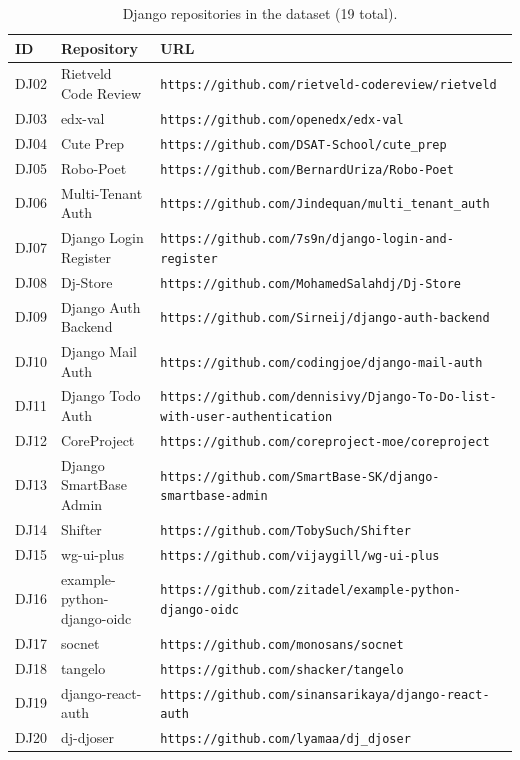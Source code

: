 \begin{table}[H]
\centering
\caption{Django repositories in the dataset (19 total).}
\label{tab:dataset-django-full}
\renewcommand{\arraystretch}{1.3}
\small
\begin{tabular}{p{} p{} p{}}
\toprule
\textbf{ID} & \textbf{Repository} & \textbf{URL} \\
\midrule
DJ02 & Rietveld Code Review          & {\small\nolinkurl{https://github.com/rietveld-codereview/rietveld}} \\
DJ03 & edx-val                       & {\small\nolinkurl{https://github.com/openedx/edx-val}} \\
DJ04 & Cute Prep                     & {\small\nolinkurl{https://github.com/DSAT-School/cute_prep}} \\
DJ05 & Robo-Poet                     & {\small\nolinkurl{https://github.com/BernardUriza/Robo-Poet}} \\
DJ06 & Multi-Tenant Auth             & {\small\nolinkurl{https://github.com/Jindequan/multi_tenant_auth}} \\
DJ07 & Django Login Register         & {\small\nolinkurl{https://github.com/7s9n/django-login-and-register}} \\
DJ08 & Dj-Store                      & {\small\nolinkurl{https://github.com/MohamedSalahdj/Dj-Store}} \\
DJ09 & Django Auth Backend           & {\small\nolinkurl{https://github.com/Sirneij/django-auth-backend}} \\
DJ10 & Django Mail Auth              & {\small\nolinkurl{https://github.com/codingjoe/django-mail-auth}} \\
DJ11 & Django Todo Auth              & {\small\nolinkurl{https://github.com/dennisivy/Django-To-Do-list-with-user-authentication}} \\
DJ12 & CoreProject                   & {\small\nolinkurl{https://github.com/coreproject-moe/coreproject}} \\
DJ13 & Django SmartBase Admin        & {\small\nolinkurl{https://github.com/SmartBase-SK/django-smartbase-admin}} \\
DJ14 & Shifter                       & {\small\nolinkurl{https://github.com/TobySuch/Shifter}} \\
DJ15 & wg-ui-plus                    & {\small\nolinkurl{https://github.com/vijaygill/wg-ui-plus}} \\
DJ16 & example-python-django-oidc    & {\small\nolinkurl{https://github.com/zitadel/example-python-django-oidc}} \\
DJ17 & socnet                        & {\small\nolinkurl{https://github.com/monosans/socnet}} \\
DJ18 & tangelo                       & {\small\nolinkurl{https://github.com/shacker/tangelo}} \\
DJ19 & django-react-auth             & {\small\nolinkurl{https://github.com/sinansarikaya/django-react-auth}} \\
DJ20 & dj-djoser                     & {\small\nolinkurl{https://github.com/lyamaa/dj_djoser}} \\
\bottomrule
\end{tabular}
\end{table}

